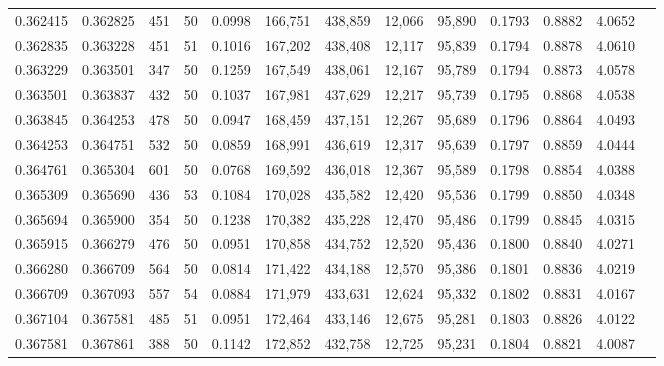 \begin{tabular}{rrrrrrrrrrrrr}
0.362415 & 0.362825 &   451 &  50 &                                     0.0998 & 166,751 & 438,859 &  12,066 &  95,890 & 0.1793 & 0.8882 & 4.0652 \\
0.362835 & 0.363228 &   451 &  51 &                                     0.1016 & 167,202 & 438,408 &  12,117 &  95,839 & 0.1794 & 0.8878 & 4.0610 \\
0.363229 & 0.363501 &   347 &  50 &                                     0.1259 & 167,549 & 438,061 &  12,167 &  95,789 & 0.1794 & 0.8873 & 4.0578 \\
0.363501 & 0.363837 &   432 &  50 &                                     0.1037 & 167,981 & 437,629 &  12,217 &  95,739 & 0.1795 & 0.8868 & 4.0538 \\
0.363845 & 0.364253 &   478 &  50 &                                     0.0947 & 168,459 & 437,151 &  12,267 &  95,689 & 0.1796 & 0.8864 & 4.0493 \\
0.364253 & 0.364751 &   532 &  50 &                                     0.0859 & 168,991 & 436,619 &  12,317 &  95,639 & 0.1797 & 0.8859 & 4.0444 \\
0.364761 & 0.365304 &   601 &  50 &                                     0.0768 & 169,592 & 436,018 &  12,367 &  95,589 & 0.1798 & 0.8854 & 4.0388 \\
0.365309 & 0.365690 &   436 &  53 &                                     0.1084 & 170,028 & 435,582 &  12,420 &  95,536 & 0.1799 & 0.8850 & 4.0348 \\
0.365694 & 0.365900 &   354 &  50 &                                     0.1238 & 170,382 & 435,228 &  12,470 &  95,486 & 0.1799 & 0.8845 & 4.0315 \\
0.365915 & 0.366279 &   476 &  50 &                                     0.0951 & 170,858 & 434,752 &  12,520 &  95,436 & 0.1800 & 0.8840 & 4.0271 \\
0.366280 & 0.366709 &   564 &  50 &                                     0.0814 & 171,422 & 434,188 &  12,570 &  95,386 & 0.1801 & 0.8836 & 4.0219 \\
0.366709 & 0.367093 &   557 &  54 &                                     0.0884 & 171,979 & 433,631 &  12,624 &  95,332 & 0.1802 & 0.8831 & 4.0167 \\
0.367104 & 0.367581 &   485 &  51 &                                     0.0951 & 172,464 & 433,146 &  12,675 &  95,281 & 0.1803 & 0.8826 & 4.0122 \\
0.367581 & 0.367861 &   388 &  50 &                                     0.1142 & 172,852 & 432,758 &  12,725 &  95,231 & 0.1804 & 0.8821 & 4.0087 \\

\end{tabular}
